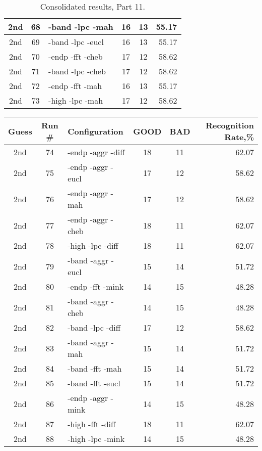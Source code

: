 \begin{table}
\begin{minipage}[b]{\textwidth}
\begin{tabular}{|c|c|l|c|c|r|}
2nd & 68 & -band -lpc -mah  & 16 & 13 & 55.17\\ \hline
2nd & 69 & -band -lpc -eucl  & 16 & 13 & 55.17\\ \hline
2nd & 70 & -endp -fft -cheb  & 17 & 12 & 58.62\\ \hline
2nd & 71 & -band -lpc -cheb  & 17 & 12 & 58.62\\ \hline
2nd & 72 & -endp -fft -mah  & 16 & 13 & 55.17\\ \hline
2nd & 73 & -high -lpc -mah  & 17 & 12 & 58.62\\ \hline
\end{tabular}
\end{minipage}
\caption{Consolidated results, Part 11.}
\label{tab:results11}
\end{table}

\begin{table}
\begin{minipage}[b]{\textwidth}
\centering
\begin{tabular}{|c|c|l|c|c|r|} \hline
Guess & Run \# & Configuration & GOOD & BAD & Recognition Rate,\%\\ \hline\hline
2nd & 74 & -endp -aggr -diff  & 18 & 11 & 62.07\\ \hline
2nd & 75 & -endp -aggr -eucl  & 17 & 12 & 58.62\\ \hline
2nd & 76 & -endp -aggr -mah  & 17 & 12 & 58.62\\ \hline
2nd & 77 & -endp -aggr -cheb  & 18 & 11 & 62.07\\ \hline
2nd & 78 & -high -lpc -diff  & 18 & 11 & 62.07\\ \hline
2nd & 79 & -band -aggr -eucl  & 15 & 14 & 51.72\\ \hline
2nd & 80 & -endp -fft -mink  & 14 & 15 & 48.28\\ \hline
2nd & 81 & -band -aggr -cheb  & 14 & 15 & 48.28\\ \hline
2nd & 82 & -band -lpc -diff  & 17 & 12 & 58.62\\ \hline
2nd & 83 & -band -aggr -mah  & 15 & 14 & 51.72\\ \hline
2nd & 84 & -band -fft -mah  & 15 & 14 & 51.72\\ \hline
2nd & 85 & -band -fft -eucl  & 15 & 14 & 51.72\\ \hline
2nd & 86 & -endp -aggr -mink  & 14 & 15 & 48.28\\ \hline
2nd & 87 & -high -fft -diff  & 18 & 11 & 62.07\\ \hline
2nd & 88 & -high -lpc -mink  & 14 & 15 & 48.28\\ \hline

\end{tabular}
\end{minipage}
\end{table}
